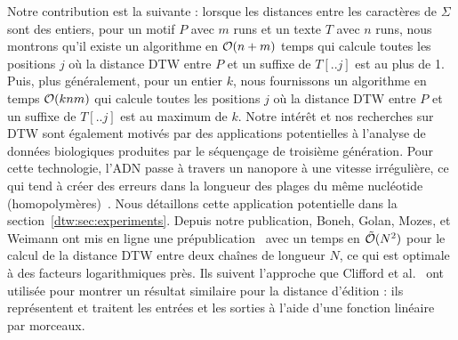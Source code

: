 Notre contribution est la suivante : lorsque les distances entre les caractères de $\Sigma$ sont des entiers, pour un motif $P$ avec $m$ runs et un texte $T$ avec $n$ runs, nous montrons qu'il existe un algorithme en $\mathcal{O}(n+m)$ temps qui calcule toutes les positions $j$ où la distance DTW entre $P$ et un suffixe de $T[..j]$ est au plus de 1. Puis, plus généralement, pour un entier $k$, nous fournissons un algorithme en temps $\mathcal{O}(knm)$ qui calcule toutes les positions $j$ où la distance DTW entre $P$ et un suffixe de $T[..j]$ est au maximum de $k$.
Notre intérêt et nos recherches sur DTW sont également motivés par des applications potentielles à l'analyse de données biologiques produites par le séquençage de troisième génération. Pour cette technologie, l'ADN passe à travers un nanopore à une vitesse irrégulière, ce qui tend à créer des erreurs dans la longueur des plages du même nucléotide (homopolymères)~\cite{delahaye2021sequencing}. Nous détaillons cette application potentielle dans la section~\ref{dtw:sec:experiments}.
Depuis notre publication, Boneh, Golan, Mozes, et Weimann ont mis en ligne une prépublication~\cite{boneh2023near} avec un temps en $\tilde{\mathcal{O}}(N^2)$ pour le calcul de la distance DTW entre deux chaînes de longueur $N$, ce qui est optimale à des facteurs logarithmiques près. Ils suivent l'approche que Clifford et al.~\cite{clifford2019rle} ont utilisée pour montrer un résultat similaire pour la distance d'édition : ils représentent et traitent les entrées et les sorties à l'aide d'une fonction linéaire par morceaux.\\


